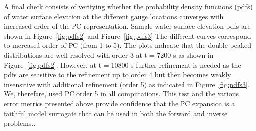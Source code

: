  
A final check consists of verifying whether the probability density
functions (pdfs) of water surface elevation at the different gauge locations
converges with increased order of the PC representation.  Sample
water surface elevation pdfs are shown in Figure~\ref{fig:pdfs2}
and Figure~\ref{fig:pdfs3}
The different curves correspond to increased order of PC (from 1 to 5).
The plots indicate that the double peaked distributions are
well-resolved with order 3 at t = 7200 s as shown in Figure~\ref{fig:pdfs2}.
However, at t = 10800 s further refinement is needed as the pdfs are
sensitive to the refinement up to order 4 but then becomes weakly 
insensitive with additional refinement  (order 5) as indicated in Figure~\ref{fig:pdfs3}. 
We, therefore, used PC order 5 in all computations.
This test and the various error metrics presented above provide confidence that the PC expansion is a faithful 
model surrogate that can be used in both the forward and inverse problems.. 

